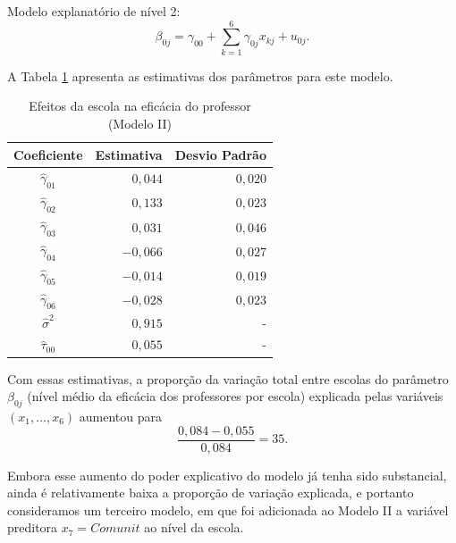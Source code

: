 \documentclass[]{book}
\numberwithin{example}{chapter}
\numberwithin{remark}{chapter}
\numberwithin{definition}{chapter}
\begin{document}
Modelo explanatório de nível 2: \[
\beta _{0j}=\gamma _{00}+\sum\limits_{k=1}^{6}\gamma _{0j}x_{kj}+u_{0j}.
\]

A Tabela \ref{tab95} apresenta as estimativas dos parâmetros para este
modelo.

\begin{center}
\begin{table}[tbp] \centering%
\caption{Efeitos da escola na eficácia do professor (Modelo II)}\bigskip
\label{tab95}
\begin{tabular}{|c|c|c|}
\hline\hline
Coeficiente & Estimativa & Desvio Padrão \\ \hline\hline
$\hat{\gamma}_{01}$ & \multicolumn{1}{|r|}{$0,044$} & \multicolumn{1}{|r|}{$%
0,020$} \\
$\hat{\gamma}_{02}$ & \multicolumn{1}{|r|}{$0,133$} & \multicolumn{1}{|r|}{$%
0,023$} \\
$\hat{\gamma}_{03}$ & \multicolumn{1}{|r|}{$0,031$} & \multicolumn{1}{|r|}{$%
0,046$} \\
$\hat{\gamma}_{04}$ & \multicolumn{1}{|r|}{$-0,066$} & \multicolumn{1}{|r|}{$%
0,027$} \\
$\hat{\gamma}_{05}$ & \multicolumn{1}{|r|}{$-0,014$} & \multicolumn{1}{|r|}{$%
0,019$} \\
$\hat{\gamma}_{06}$ & \multicolumn{1}{|r|}{$-0,028$} & \multicolumn{1}{|r|}{$%
0,023$} \\
$\hat{\sigma}^{2}$ & \multicolumn{1}{|r|}{$0,915$} & \multicolumn{1}{|r|}{-}
\\
$\hat{\tau}_{00}$ & \multicolumn{1}{|r|}{$0,055$} & \multicolumn{1}{|r|}{-}
\\ \hline\hline
\end{tabular}
\end{table}%
\end{center}

Com essas estimativas, a proporção da variação total entre escolas do
parâmetro \(\beta _{0j}\) (nível médio da eficácia dos professores por
escola) explicada pelas variáveis \(\left(x_{1},\ldots ,x_{6}\right)\)
aumentou para \[
\frac{0,084-0,055}{0,084}=35.
\]

Embora esse aumento do poder explicativo do modelo já tenha sido
substancial, ainda é relativamente baixa a proporção de variação
explicada, e portanto consideramos um terceiro modelo, em que foi
adicionada ao Modelo II a variável preditora \(x_{7}=Comunit\) ao nível
da escola.
\end{document}
